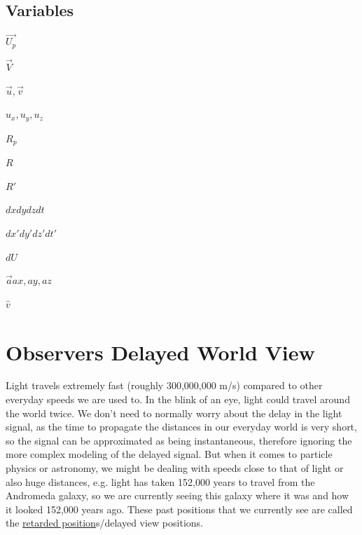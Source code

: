 \section{Variables}



$\vec{U_p}$ \newline

$\vec{V}$ \newline

$\vec{u}, \vec{v}$ \newline

$u_x, u_y, u_z$ \newline

$R_p$ \newline

$R$  \newline

$R'$ \newline

$dx dy dz dt$ \newline

$dx' dy' dz' dt'$ \newline

$dU$ \newline

$\vec{a} ax, ay, az$ \newline

$\hat{v}$ \newline


\chapter{Observers Delayed World View}

Light travels extremely fast (roughly 300,000,000 m/s) compared to other everyday speeds we are used to. In the blink of an eye, light could travel around the world twice. We don't need to normally worry about the delay in the light signal, as the time to propagate the distances in our everyday world is very short, so the signal can be approximated as being instantaneous, therefore ignoring the more complex modeling of the delayed signal. But when it comes to particle physics or astronomy, we might be dealing with speeds close to that of light or also huge distances, e.g. light has taken 152,000 years to travel from the Andromeda galaxy, so we are currently seeing this galaxy where it was and how it looked 152,000 years ago. These past positions that we currently see are called the \hyperlink{def-retarded-position}{retarded position}s/delayed view positions.


